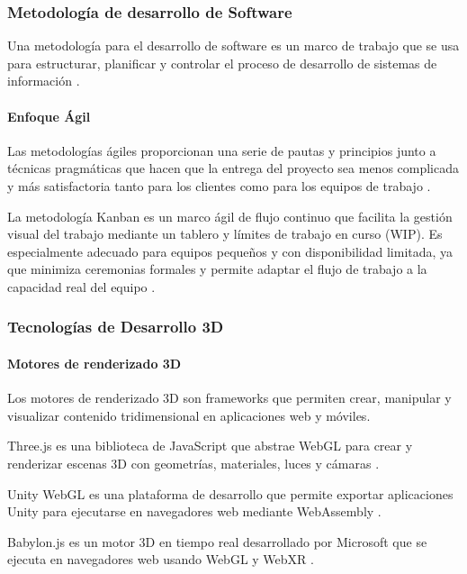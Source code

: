 \subsubsection{Metodología de desarrollo de Software}

Una metodología para el desarrollo de software es un marco de trabajo que se usa para estructurar, planificar y controlar el proceso de desarrollo de sistemas de información \cite{velneo2023}.

\paragraph{Enfoque Ágil}
Las metodologías ágiles proporcionan una serie de pautas y principios junto a técnicas pragmáticas que hacen que la entrega del proyecto sea menos complicada y más satisfactoria tanto para los clientes como para los equipos de trabajo \cite{mayda2015}.

La metodología Kanban es un marco ágil de flujo continuo que facilita la gestión visual del trabajo mediante un tablero y límites de trabajo en curso (WIP). Es especialmente adecuado para equipos pequeños y con disponibilidad limitada, ya que minimiza ceremonias formales y permite adaptar el flujo de trabajo a la capacidad real del equipo \cite{anderson2010}.

\subsubsection{Tecnologías de Desarrollo 3D}

\paragraph{Motores de renderizado 3D}
Los motores de renderizado 3D son frameworks que permiten crear, manipular y visualizar contenido tridimensional en aplicaciones web y móviles.

Three.js es una biblioteca de JavaScript que abstrae WebGL para crear y renderizar escenas 3D con geometrías, materiales, luces y cámaras \cite{threejs2023}.

Unity WebGL es una plataforma de desarrollo que permite exportar aplicaciones Unity para ejecutarse en navegadores web mediante WebAssembly \cite{unity2023}.

Babylon.js es un motor 3D en tiempo real desarrollado por Microsoft que se ejecuta en navegadores web usando WebGL y WebXR \cite{microsoft2023}.

